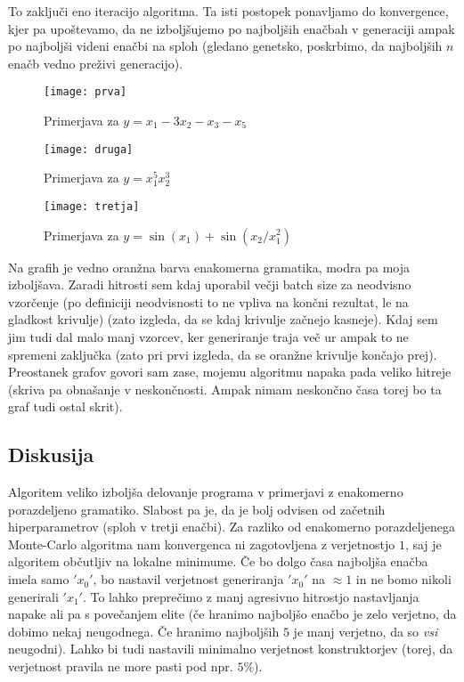 \documentclass{article}
\begin{document}
To zaključi eno iteracijo algoritma. Ta isti postopek ponavljamo do konvergence, kjer pa upoštevamo, da ne izboljšujemo po najboljših enačbah v generaciji ampak po najboljši videni enačbi na sploh (gledano genetsko, poskrbimo, da najboljših \(n\) enačb vedno preživi generacijo).

\begin{figure}[h]
    \texttt{[image: prva]}
    \caption{Primerjava za \(y=x_1-3x_2-x_3-x_5\)}
\end{figure}
\begin{figure}[h]
    \texttt{[image: druga]}
    \caption{Primerjava za \(y=x_1^5x_2^3\)}
\end{figure}
\begin{figure}[h]
    \texttt{[image: tretja]}
    \caption{Primerjava za \(y=\sin(x_1)+\sin(x_2/x_1^2)\)}
\end{figure}
Na grafih je vedno oranžna barva enakomerna gramatika, modra pa moja izboljšava. Zaradi hitrosti sem kdaj uporabil večji batch size za neodvisno vzorčenje (po definiciji neodvisnosti to ne vpliva na končni rezultat, le na gladkost krivulje) (zato izgleda, da se kdaj krivulje začnejo kasneje). Kdaj sem jim tudi dal malo manj vzorcev, ker generiranje traja več ur ampak to ne spremeni zaključka (zato pri prvi izgleda, da se oranžne krivulje končajo prej). Preostanek grafov govori sam zase, mojemu algoritmu napaka pada veliko hitreje (skriva pa obnašanje v neskončnosti. Ampak nimam neskončno časa torej bo ta graf tudi ostal skrit).
\subsection*{Diskusija} Algoritem veliko izboljša delovanje programa v primerjavi z enakomerno porazdeljeno gramatiko. Slabost pa je, da je bolj odvisen od začetnih hiperparametrov (sploh v tretji enačbi). Za razliko od enakomerno porazdeljenega Monte-Carlo algoritma nam konvergenca ni zagotovljena z verjetnostjo \(1\), saj je algoritem občutljiv na lokalne minimume. Če bo dolgo časa najboljša enačba imela samo \('x_0'\), bo nastavil verjetnost generiranja \('x_0'\) na \(\approx 1\) in ne bomo nikoli generirali \('x_1'\). To lahko preprečimo z manj agresivno hitrostjo nastavljanja napake ali pa s povečanjem elite (če hranimo najboljšo enačbo je zelo verjetno, da dobimo nekaj neugodnega. Če hranimo najboljših \(5\) je manj verjetno, da so \emph{vsi} neugodni). Lahko bi tudi nastavili minimalno verjetnost konstruktorjev (torej, da verjetnost pravila ne more pasti pod npr. \(5\%\)).
\end{document}
